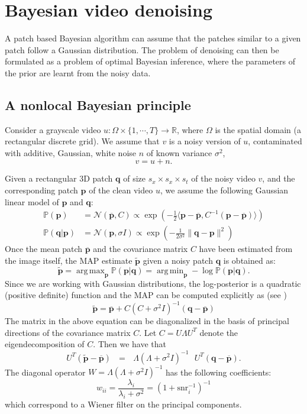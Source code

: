 \documentclass[10pt, journal, twocolumn, final, a4paper]{IEEEtran}
\newcommand{\ma}[1]{\boldsymbol{#1}}
\DeclareMathOperator*{\argmin}{arg\,min}
\DeclareMathOperator*{\argmax}{arg\,max}
\begin{document}
\section{Bayesian video denoising}
\label{sec:review_nonlocal_Bayes}

A patch based Bayesian algorithm can assume that the patches similar to a given
patch follow a Gaussian distribution.
The problem 
of denoising can then be formulated as a problem of optimal Bayesian inference, where the
parameters of the prior are learnt from the noisy data.

\subsection{A nonlocal Bayesian principle}

Consider a grayscale video $u:\Omega\times \{1,\cdots,T\}\rightarrow
\mathbb R$, where $\Omega$ is the spatial domain (a rectangular discrete grid).
We assume that $v$ is a noisy version of $u$, contaminated with additive,
Gaussian, white noise $n$ of known variance $\sigma^2$,
\[v = u + n.\]

Given a rectangular 3D patch $\ma q$ of size $s_x\times s_x\times s_t$ of the noisy video $v$, and the 
corresponding patch $\ma p$ of the clean video $u$, we assume the following 
Gaussian linear model of $\ma p$ and $\ma q$:
\begin{align}
	\mathds{P}(\ma p) &= \mathcal N(\overline {\ma p}, C) \propto \exp\left(-\frac12\langle \ma p - \overline{\ma p}, C^{-1}(\ma p - \overline{\ma p})\rangle\right) \label{eq:prior}\\
	\mathds{P}(\ma q|\ma p) &= \mathcal N(\ma p, \sigma I) \propto \exp\left(-\frac1{2\sigma^2}\|\ma q - \ma p\|^2\right) \label{eq:obs}
\end{align}
Once the mean patch $\overline{\ma p}$ and the
covariance matrix $C$ have been estimated from the image itself, the MAP
estimate $\widetilde{\ma p}$ given a noisy patch $\ma q$ is obtained as:
\[ \widetilde{\ma p} = \argmax_{\ma p} \mathds P(\ma p | \ma q) = \argmin_{\ma p} -\log \mathds P(\ma p | \ma q). \]
Since we are working with Gaussian distributions, the log-posterior is a quadratic (positive definite)
function and the MAP can be computed explicitly as (see  \cite{Lebrun2013a})
\begin{equation}
	\widetilde{\ma p} = \overline{\ma p} + C(C + \sigma^2 I)^{-1}(\ma q - \overline{\ma p})
	\label{eq:map}
\end{equation}
The matrix in the above equation can be diagonalized in the basis of
principal directions of the covariance matrix $C$.
Let $C = U\Lambda U^T$ denote the eigendecomposition of $C$. Then we have that
\[U^T(\widetilde{\ma p} - \overline{\ma p}) \,\,\,\, = \,\,\,\, 
	\Lambda(\Lambda + \sigma^2 I)^{-1}\,\,\,\,
	U^T (\ma q - \overline{\ma p}).\]
The diagonal operator $W = \Lambda(\Lambda + \sigma^2I)^{-1}$
has the following coefficients:
\begin{equation}
w_{ii} = \frac{\lambda_i}{\lambda_i + \sigma^2}
				 = (1 + \text{snr}_i^{-1})^{-1}
				 \label{eq:wiener_coeffs}
\end{equation}
which correspond to a Wiener filter on the principal components.
\end{document}
